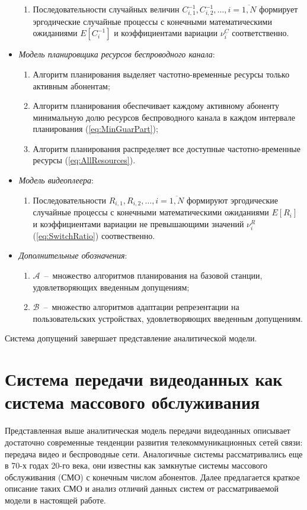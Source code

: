 \begin{itemize}
\begin{enumerate}
			\item Последовательности случайных величин $C^{-1}_{i,1}, C^{-1}_{i,2}, \ldots, i=\overline{1,N}$  формирует эргодические случайные процессы с конечными математическими ожиданиями $E[C_i^{-1}]$ и коэффициентами вариации $\nu^{C}_i$ соответственно.
		\end{enumerate}
	\item \textit{Модель планировщика ресурсов беспроводного канала}:
		\begin{enumerate}
			\item Алгоритм планирования выделяет частотно-временные ресурсы только активным абонентам;
			\item Алгоритм планирования обеспечивает каждому активному абоненту минимальную долю ресурсов беспроводного канала в каждом интервале планирования (\ref{eq:MinGuarPart});
			\item Алгоритм планирования распределяет все доступные частотно-временные ресурсы (\ref{eq:AllResources}).
		\end{enumerate}
	\item \textit{Модель видеоплеера}:
		\begin{enumerate}
			\item Последовательности $R_{i,1}, R_{i,2}, \ldots, i=\overline{1,N}$ формируют эргодические случайные процессы с конечными математическими ожиданиями $E[R_{i}]$ и коэффициентами вариации не превышающими значений $\nu^R_i$ (\ref{eq:SwitchRatio}) соотвественно.
		\end{enumerate}
  \item \textit{Дополнительные обозначения}:
  \begin{enumerate}
  \item $\mathcal{A}$~--~множество алгоритмов планирования на базовой станции, удовлетворяющих введенным допущениям;
  \item $\mathcal{B}$~--~множество алгоритмов адаптации репрезентации на пользовательских устройствах, удовлетворяющих введенным допущениям.
  \end{enumerate}
\end{itemize}
Система допущений завершает представление аналитической модели.

\section{Система передачи видеоданных как система массового обслуживания}
\label{chap2:QueuningNetwork}

Представленная выше аналитическая модель передачи видеоданных описывает достаточно современные тенденции развития телекоммуникационных сетей связи: передача видео и беспроводные сети. Аналогичные системы рассматривались еще в 70-х годах 20-го века, они известны как замкнутые системы массового обслуживания (СМО) с конечным числом абонентов. Далее предлагается краткое описание таких СМО и анализ отличий данных систем от рассматриваемой модели в настоящей работе.

